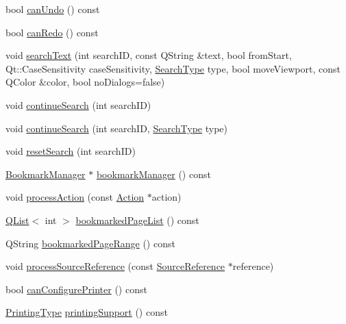 \begin{DoxyCompactItemize}
bool \hyperlink{classOkular_1_1Document_ae2d50d5d74f0acec1d9ca86e3742ae16}{can\+Undo} () const 
\item 
bool \hyperlink{classOkular_1_1Document_a7bb3610409fcc2be99007213cfa2f3cd}{can\+Redo} () const 
\item 
void \hyperlink{classOkular_1_1Document_a9da5fe32531f4ab8b515ed553092421f}{search\+Text} (int search\+I\+D, const Q\+String \&text, bool from\+Start, Qt\+::\+Case\+Sensitivity case\+Sensitivity, \hyperlink{classOkular_1_1Document_af4b4b32563d6013d6da10be1667a7bad}{Search\+Type} type, bool move\+Viewport, const Q\+Color \&color, bool no\+Dialogs=false)
\item 
void \hyperlink{classOkular_1_1Document_a36cc2e539c7fd032e5f03b26ffa6ddae}{continue\+Search} (int search\+I\+D)
\item 
void \hyperlink{classOkular_1_1Document_a13301541ff7a60a1511813d75a46a730}{continue\+Search} (int search\+I\+D, \hyperlink{classOkular_1_1Document_af4b4b32563d6013d6da10be1667a7bad}{Search\+Type} type)
\item 
void \hyperlink{classOkular_1_1Document_a9a6bfbdfcf7a07fcf3b2624fdea81126}{reset\+Search} (int search\+I\+D)
\item 
\hyperlink{classOkular_1_1BookmarkManager}{Bookmark\+Manager} $\ast$ \hyperlink{classOkular_1_1Document_a2a2a1f0f5384563c8b24c2ba48809839}{bookmark\+Manager} () const 
\item 
void \hyperlink{classOkular_1_1Document_aabdf41f40fe0391590391e303891b5ed}{process\+Action} (const \hyperlink{classOkular_1_1Action}{Action} $\ast$action)
\item 
\hyperlink{classQList}{Q\+List}$<$ int $>$ \hyperlink{classOkular_1_1Document_a01de5a7212e14772e647a8e1caa07627}{bookmarked\+Page\+List} () const 
\item 
Q\+String \hyperlink{classOkular_1_1Document_ae54c00670b879c5d583e37c51c967860}{bookmarked\+Page\+Range} () const 
\item 
void \hyperlink{classOkular_1_1Document_a211b3b966271e561257def97439732a5}{process\+Source\+Reference} (const \hyperlink{classOkular_1_1SourceReference}{Source\+Reference} $\ast$reference)
\item 
bool \hyperlink{classOkular_1_1Document_ad5aa67984b07fc83309ab7798274a60a}{can\+Configure\+Printer} () const 
\item 
\hyperlink{classOkular_1_1Document_ad5630e57d57d854b37ed4b362f7dab12}{Printing\+Type} \hyperlink{classOkular_1_1Document_ab126b62cb37b419a4d51b4c30729e85b}{printing\+Support} () const 

\end{DoxyCompactItemize}

